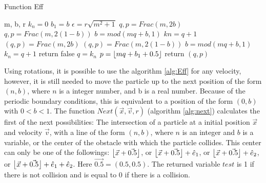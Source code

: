 \documentclass{iopart}
\begin{document}
\begin{algorithm}
\caption{Function Eff}
\label{alg:Eff}
\begin{algorithmic}
 {m, b, r} 
\State	$k_n = 0$
\State  $b_1=b$
\State  $ \epsilon=r \sqrt{m^2+1}$ 
\State			$q, p = Frac(m, 2b)$
		\Else
\State			$q, p = Frac(m, 2(1 - b))$
		\EndIf
\State		$b = mod(m q + b, 1)$
\State		$kn = q+1$
\EndIf  
{}
\State			$(q, p) = Frac(m, 2 b)$
        \Else 
\State			$(q, p) = Frac(m, 2 (1- b))$
\EndIf
\State		$b = mod(m q + b, 1)$
\State		$k_n = q+1$
\State            return false
\EndIf
\EndWhile
\State	$q = k_n$
\State    $p = \floor*{m q+b_1+0.5}$
\State    return $(q, p)$
\EndFunction
\end{algorithmic}
\end{algorithm}

Using rotations, it is possible to use the algorithm \ref{alg:Eff} for any velocity, however, it is still needed to move the particle up to the next position of the form $(n,b)$, where $n$ is a integer number, and b is a real number. Because of the periodic boundary conditions, this is equivalent to a position of the form $(0,b)$
with $0<b<1$.  The function $Next(\vec{x},\vec{v},r)$ (algorithm \ref{alg:next}) calculates the first of the
next possibilities: The intersection of a particle at a initial position $\vec{x}$ and velocity $\vec{v}$, with a line of the form $(n,b)$, where $n$ is an integer and $b$ is a variable, or the center of the obstacle with
which the particle collides. This center can only be one of the followings: $\floor*{\vec{x}+\vec{0.5}}$, or $\floor*{\vec{x}+\vec{0.5}}+\hat{e}_1$, or $\floor*{\vec{x}+\vec{0.5}}+\hat{e}_2$, or $\floor*{\vec{x}+\vec{0.5}}+\hat{e}_1+\hat{e}_2$. Here $\vec{0.5}=(0.5,0.5)$. The returned variable $test$ is 1 if there is not collision and is equal to 0 if there is a collision. 
\end{document}
